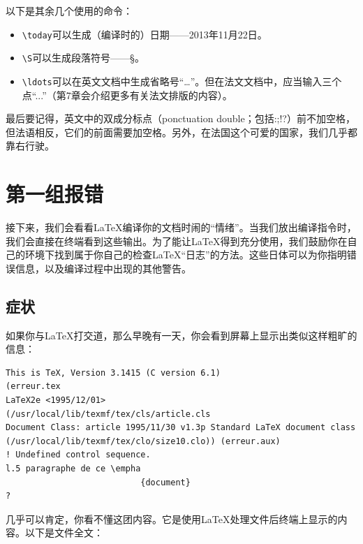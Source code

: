 以下是其余几个使用的命令：

\begin{itemize}
    \item \verb|\today|可以生成（编译时的）日期——2013年11月22日。
    \item \verb|\S|可以生成段落符号——\S。
    \item \verb|\ldots|可以在英文文档中生成省略号“\ldots”。但在法文文档中，应当输入三个点“...”（第7章会介绍更多有关法文排版的内容）。%
\end{itemize}

最后要记得，英文中的双成分标点（ponctuation double；包括:;!?）前不加空格，但法语相反，它们的前面需要加空格。另外，在法国这个可爱的国家，我们几乎都靠右行驶。

\section{第一组报错}

\begin{exclamation}
    接下来，我们会看看\LaTeX 编译你的文档时闹的“情绪”。当我们放出编译指令时，我们会直接在终端看到这些输出。为了能让\LaTeX 得到充分使用，我们鼓励你在自己的环境下找到属于你自己的检查\LaTeX “\textsf{日志}”的方法。这些日体可以为你指明错误信息，以及编译过程中出现的其他警告。
\end{exclamation}

\subsection{症状}

如果你与\LaTeX 打交道，那么早晚有一天，你会看到屏幕上显示出类似这样粗旷的信息：

\begin{dmd}
    \linenumbers
    \begin{verbatim}
This is TeX, Version 3.1415 (C version 6.1)
(erreur.tex
LaTeX2e <1995/12/01>
(/usr/local/lib/texmf/tex/cls/article.cls
Document Class: article 1995/11/30 v1.3p Standard LaTeX document class
(/usr/local/lib/texmf/tex/clo/size10.clo)) (erreur.aux)
! Undefined control sequence.
l.5 paragraphe de ce \empha
                           {document}
?\end{verbatim}
\end{dmd}

几乎可以肯定，你看不懂这团内容。它是使用\LaTeX 处理文件后终端上显示的内容。以下是文件全文：

